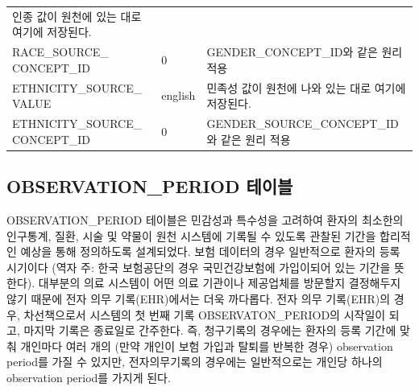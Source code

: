 \documentclass[10.5pt]{book}
\theoremstyle{definition}
\theoremstyle{definition}
\theoremstyle{definition}
\theoremstyle{remark}
\begin{document}
\begin{longtable}[]{@{}lll@{}}
\begin{minipage}[t]{0.48\columnwidth}
인종 값이 원천에 있는 대로 여기에 저장된다.\strut
\end{minipage}\tabularnewline
\begin{minipage}[t]{0.28\columnwidth}\raggedright\strut
RACE\_SOURCE\_ CONCEPT\_ID\strut
\end{minipage} & \begin{minipage}[t]{0.16\columnwidth}\raggedright\strut
0\strut
\end{minipage} & \begin{minipage}[t]{0.48\columnwidth}\raggedright\strut
GENDER\_CONCEPT\_ID와 같은 원리 적용\strut
\end{minipage}\tabularnewline
\begin{minipage}[t]{0.28\columnwidth}\raggedright\strut
ETHNICITY\_SOURCE\_ VALUE\strut
\end{minipage} & \begin{minipage}[t]{0.16\columnwidth}\raggedright\strut
english\strut
\end{minipage} & \begin{minipage}[t]{0.48\columnwidth}\raggedright\strut
민족성 값이 원천에 나와 있는 대로 여기에 저장된다.\strut
\end{minipage}\tabularnewline
\begin{minipage}[t]{0.28\columnwidth}\raggedright\strut
ETHNICITY\_SOURCE\_ CONCEPT\_ID\strut
\end{minipage} & \begin{minipage}[t]{0.16\columnwidth}\raggedright\strut
0\strut
\end{minipage} & \begin{minipage}[t]{0.48\columnwidth}\raggedright\strut
GENDER\_SOURCE\_CONCEPT\_ID와 같은 원리 적용\strut
\end{minipage}\tabularnewline
\bottomrule
\end{longtable}

\subsection{OBSERVATION\_PERIOD 테이블}\label{observationPeriod}

OBSERVATION\_PERIOD 테이블은 민감성과 특수성을 고려하여 환자의 최소한의
인구통계, 질환, 시술 및 약물이 원천 시스템에 기록될 수 있도록 관찰된
기간을 합리적인 예상을 통해 정의하도록 설계되었다. 보험 데이터의 경우
일반적으로 환자의 등록 시기이다 (역자 주: 한국 보험공단의 경우
국민건강보험에 가입이되어 있는 기간을 뜻한다). 대부분의 의료 시스템이
어떤 의료 기관이나 제공업체를 방문할지 결정해두지 않기 때문에 전자 의무
기록(EHR)에서는 더욱 까다롭다. 전자 의무 기록(EHR)의 경우, 차선책으로서
시스템의 첫 번째 기록 OBSERVATON\_PERIOD의 시작일이 되고, 마지막 기록은
종료일로 간주한다. 즉, 청구기록의 경우에는 환자의 등록 기간에 맞춰
개인마다 여러 개의 (만약 개인이 보험 가입과 탈퇴를 반복한 경우)
observation period를 가질 수 있지만, 전자의무기록의 경우에는
일반적으로는 개인당 하나의 observation period를 가지게 된다.
\end{document}

